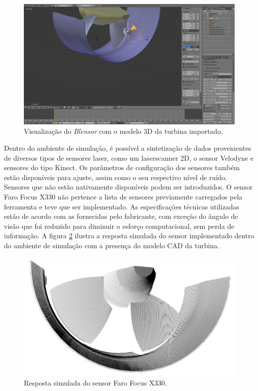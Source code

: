 \begin{figure}[h!]
	\centering
	\includegraphics[width=0.9\columnwidth]{method/figs/calibracao/blensor_screen}
	\caption{Visualização do \textit{Blensor} com o modelo 3D da turbina
	importado.}
    \label{fig::blensor_screen}
\end{figure}

Dentro do ambiente de simulação, é possível a sintetização de dados provenientes
de diversos tipos de sensores laser, como um laserscanner 2D, o sensor
Velodyne e sensores do tipo Kinect. Os parâmetros de configuração
dos sensores também estão disponíveis para ajuste, assim como o seu respectivo
nível de ruído.
Sensores que não estão nativamente disponíveis podem ser introduzidos. O sensor Faro Focus X330 não
pertence a lista de sensores previamente carregados pela ferramenta e teve que
ser implementado. As especificações técnicas utilizadas estão de acordo com as
fornecidas pelo fabricante, com exceção do ângulo de visão que foi reduzido para
diminuir o esforço computacional, sem perda de informação. A figura
\ref{fig::blensor_faro} ilustra a resposta simulada do sensor implementado
dentro do ambiente de simulação com a presença do modelo CAD da turbina.


 \begin{figure}[H]
	\centering
	\includegraphics[width=0.9\columnwidth]{method/figs/calibracao/blensor_faro}
	\caption{Resposta simulada do sensor Faro Focus X330.}
    \label{fig::blensor_faro}
\end{figure}	


